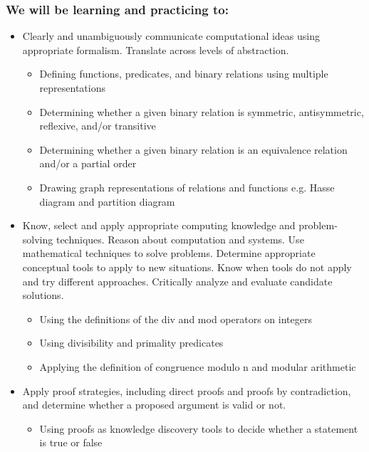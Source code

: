 \subsubsection*{We will be learning and practicing to:}
\begin{itemize}

\item Clearly and unambiguously communicate computational ideas using appropriate formalism. Translate across levels of abstraction.
\begin{itemize}
    \item Defining functions, predicates, and binary relations using multiple representations
    \item Determining whether a given binary relation is symmetric, antisymmetric, reflexive, and/or transitive
    \item Determining whether a given binary relation is an equivalence relation and/or a partial order
    \item Drawing graph representations of relations and functions e.g. Hasse diagram and partition diagram
\end{itemize}

\item Know, select and apply appropriate computing knowledge and problem-solving techniques. Reason about computation and systems. Use mathematical techniques to solve problems. Determine appropriate conceptual tools to apply to new situations. Know when tools do not apply and try different approaches. Critically analyze and evaluate candidate solutions.
\begin{itemize}
    \item Using the definitions of the div and mod operators on integers
    \item Using divisibility and primality predicates
    \item Applying the definition of congruence modulo n and modular arithmetic
\end{itemize}

\item Apply proof strategies, including direct proofs and proofs by contradiction, and determine whether a proposed argument is valid or not.
\begin{itemize}
    \item Using proofs as knowledge discovery tools to decide whether a statement is true or false
\end{itemize}
\end{itemize}


